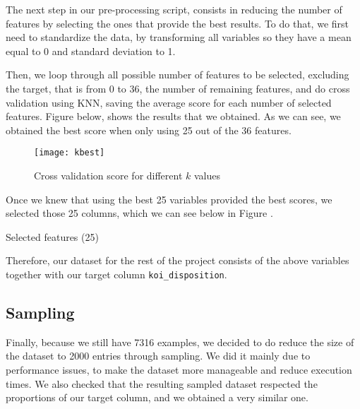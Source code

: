The next step in our pre-processing script, consists in reducing the number of features
by selecting the ones that provide the best results. To do that, we first need to
standardize the data, by transforming all variables so they have a mean equal to 0
and standard deviation to 1.

Then, we loop through all possible number of features to be selected, 
excluding the target, that is from 0
to 36, the number of remaining features, and do cross validation using KNN, saving
the average score for each number of selected features. Figure \cite{fig:feature_cross}
below, shows the results that we obtained. As we can see, we obtained the best score
when only using 25 out of the 36 features.

\begin{figure}[H]
    \centering
    \texttt{[image: kbest]}
    \caption{Cross validation score for different $k$ values}%
    \label{fig:feature_cross}
\end{figure}

Once we knew that using the best 25 variables provided the best scores, we selected
those 25 columns, which we can see below in Figure \cite{tab:features}.

\begin{table}[H]
    \centering
    \caption{Selected features (25)}%
    \label{tab:features}
    
\end{table}

Therefore, our dataset for the rest of the project consists of the above variables
together with our target column \texttt{koi\_disposition}.

\subsection{Sampling}

Finally, because we still have 7316 examples, we decided to do reduce the size of the
dataset to 2000 entries through sampling. We did it mainly due to performance issues,
to make the dataset more manageable and reduce execution times. We also checked that
the resulting sampled dataset respected the proportions of our
target column, and we obtained a very similar one.
